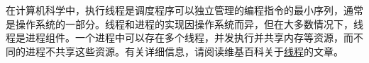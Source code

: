 在计算机科学中，执行线程是调度程序可以独立管理的编程指令的最小序列，通常是操作系统的一部分。线程和进程的实现因操作系统而异，但在大多数情况下，线程是进程组件。一个进程中可以存在多个线程，并发执行并共享内存等资源，而不同的进程不共享这些资源。有关详细信息，请阅读维基百科关于\href{https://en.wikipedia.org/wiki/Thread_(computing)}{线程}的文章。
